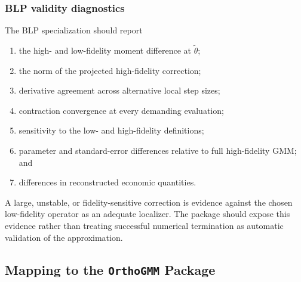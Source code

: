 \subsubsection{BLP validity diagnostics}

The BLP specialization should report
\begin{enumerate}
 \item the high- and low-fidelity moment difference at
 $\widetilde\theta$;
 \item the norm of the projected high-fidelity correction;
 \item derivative agreement across alternative local step sizes;
 \item contraction convergence at every demanding evaluation;
 \item sensitivity to the low- and high-fidelity definitions;
 \item parameter and standard-error differences relative to full
 high-fidelity GMM; and
 \item differences in reconstructed economic quantities.
\end{enumerate}
A large, unstable, or fidelity-sensitive correction is evidence against the
chosen low-fidelity operator as an adequate localizer. The package should expose
this evidence rather than treating successful numerical termination as
automatic validation of the approximation.

\subsection{Mapping to the \texttt{OrthoGMM} Package}
\label{app:orthogmm_mapping}


